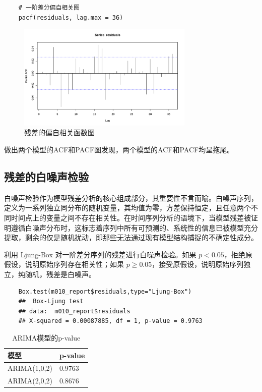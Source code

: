 \documentclass{article} %
\begin{document}
\begin{lstlisting}
    # 一阶差分偏自相关图
    pacf(residuals, lag.max = 36)
\end{lstlisting}

\begin{figure}[H] %
	\centering %
	\includegraphics[width=0.75\textwidth]{pic/respacf.pdf} %
	\caption{残差的偏自相关函数图} %
\end{figure}

做出两个模型的ACF和PACF图发现，两个模型的ACF和PACF均呈拖尾。


\subsection{残差的白噪声检验}
白噪声检验作为模型残差分析的核心组成部分，其重要性不言而喻。白噪声序列，定义为一系列独立同分布的随机变量，其均值为零，方差保持恒定，且任意两个不同时间点上的变量之间不存在相关性。在时间序列分析的语境下，当模型残差被证明遵循白噪声分布时，这标志着序列中所有可预测的、系统性的信息已被模型充分提取，剩余的仅是随机扰动，即那些无法通过现有模型结构捕捉的不确定性成分。

利用 Ljung-Box 对一阶差分序列的残差进行白噪声检验。如果 \(p<0.05\)，拒绝原假设，说明原始序列存在相关性；如果 \(p \geq 0.05\)，接受原假设，说明原始序列独立，纯随机，残差是白噪声。
\begin{lstlisting}
    Box.test(m010_report$residuals,type="Ljung-Box")
    ##  Box-Ljung test
    ## data:  m010_report$residuals
    ## X-squared = 0.00087885, df = 1, p-value = 0.9763
\end{lstlisting}

\begin{table}[H]
    \centering
    \begin{tabular}{ll} %
    \toprule %
    模型 & p-value \\
    \midrule %
    ARIMA(1,0,2) & 0.9763 \\
    ARIMA(2,0,2) & 0.8676 \\
    \bottomrule %
    \end{tabular}
    \caption{ARIMA模型的p-value}
    \label{tab:model-pvalues}
\end{table}
\end{document}

